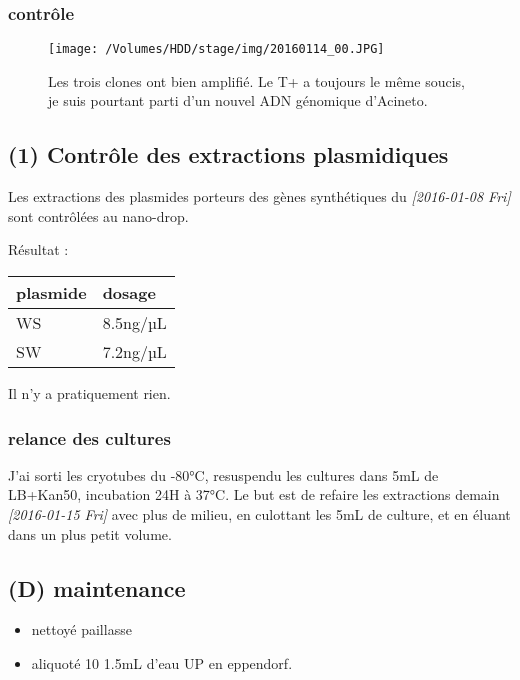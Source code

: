 \documentclass[9pt, oneside, twocolumn]{scrartcl}
\begin{document}
\subsubsection{contrôle}
\label{sec:orgheadline33}

\begin{figure}[htb]
\centering
\texttt{[image: /Volumes/HDD/stage/img/20160114\_00.JPG]}
\caption{Les trois clones ont bien amplifié. Le T+ a toujours le même soucis, je suis pourtant parti d'un nouvel ADN génomique d'Acineto.}
\end{figure}

\subsection{(1) Contrôle des extractions plasmidiques}
\label{sec:orgheadline36}
Les extractions des plasmides porteurs des gènes synthétiques du
\textit{[2016-01-08 Fri] } sont contrôlées au nano-drop.

Résultat :
\begin{center}
\begin{tabular}{ll}
\toprule
plasmide & dosage\\
\midrule
WS & 8.5ng/µL\\
SW & 7.2ng/µL\\
\bottomrule
\end{tabular}
\end{center}

Il n'y a pratiquement rien. 

\subsubsection{relance des cultures}
\label{sec:orgheadline35}
J'ai sorti les cryotubes du -80°C, resuspendu les cultures dans 5mL de LB+Kan50,
incubation 24H à 37°C. Le but est de refaire les extractions demain
\textit{[2016-01-15 Fri] } avec plus de milieu, en culottant les 5mL de culture, et en
éluant dans un plus petit volume.

\subsection{(D) maintenance}
\label{sec:orgheadline37}
\begin{itemize}
\item nettoyé paillasse
\item aliquoté 10 \texttimes{} 1.5mL d'eau UP en eppendorf.
\end{itemize}
\end{document}
